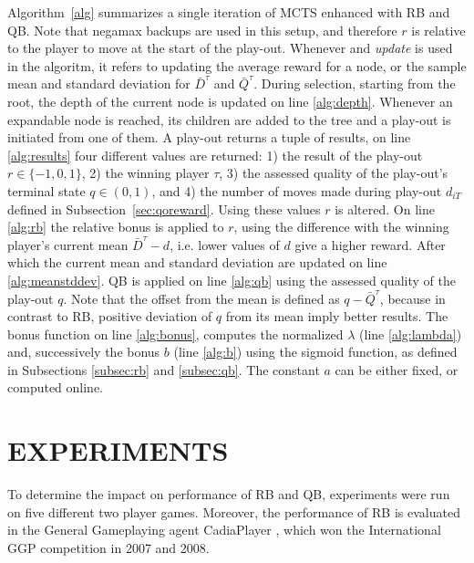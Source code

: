 \documentclass{ecai2014}
\begin{document}
Algorithm~\ref{alg} summarizes a single iteration of MCTS enhanced with RB and QB. Note that negamax backups are used in this setup, and therefore $r$ is relative to the player to move at the start of the play-out. Whenever and \emph{update} is used in the algoritm, it refers to updating the average reward for a node, or the sample mean and standard deviation for $\bar{D}^\tau$ and $\bar{Q}^\tau$. During selection, starting from the root, the depth of the current node is updated on line \ref{alg:depth}. Whenever an expandable node is reached, its children are added to the tree and a play-out is initiated from one of them. A play-out returns a tuple of results, on line \ref{alg:results} four different values are returned: 1) the result of the play-out $r \in \{-1, 0, 1\}$, 2) the winning player $\tau$, 3) the assessed quality of the play-out's terminal state $q\in(0,1)$, and 4) the number of moves made during play-out $d_{iT}$ defined in Subsection~\ref{sec:qoreward}. Using these values $r$ is altered. On line \ref{alg:rb} the relative bonus is applied to $r$, using the difference with the winning player's current mean $\bar{D}^\tau - d$, i.e. lower values of $d$ give a higher reward. After which the current mean and standard deviation are updated on line \ref{alg:meanstddev}. QB is applied on line \ref{alg:qb} using the assessed quality of the play-out $q$. Note that the offset from the mean is defined as $q - \bar{Q}^\tau$, because in contrast to RB, positive deviation of $q$ from its mean imply better results. The {\sc bonus} function on line \ref{alg:bonus}, computes the normalized $\lambda$ (line \ref{alg:lambda}) and, successively the bonus $b$ (line \ref{alg:b}) using the sigmoid function, as defined in Subsections \ref{subsec:rb} and \ref{subsec:qb}. The constant $a$ can be either fixed, or computed online.

\section{EXPERIMENTS}
\label{sec:experiments}
To determine the impact on performance of RB and QB, experiments were run on five different two player games. Moreover, the performance of RB is evaluated in the General Gameplaying agent {\sc CadiaPlayer} \cite{bjornsson2009cadiaplayer}, which won the International GGP competition in 2007 and 2008. 
\end{document}

